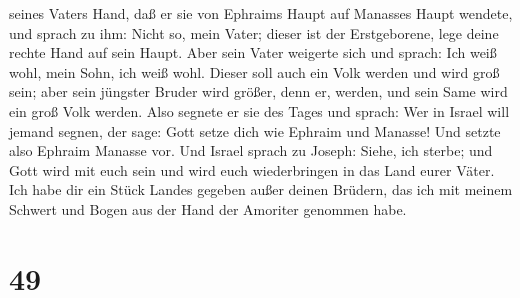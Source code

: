 seines Vaters Hand, daß er sie von Ephraims Haupt auf Manasses Haupt
wendete,  und sprach zu ihm: Nicht so, mein Vater; dieser
ist der Erstgeborene, lege deine rechte Hand auf sein Haupt.
 Aber sein Vater weigerte sich und sprach: Ich weiß wohl,
mein Sohn, ich weiß wohl. Dieser soll auch ein Volk werden und wird groß
sein; aber sein jüngster Bruder wird größer, denn er, werden, und sein
Same wird ein groß Volk werden.  Also segnete er sie des
Tages und sprach: Wer in Israel will jemand segnen, der sage: Gott setze
dich wie Ephraim und Manasse! Und setzte also Ephraim Manasse vor.
 Und Israel sprach zu Joseph: Siehe, ich sterbe; und Gott
wird mit euch sein und wird euch wiederbringen in das Land eurer Väter.
 Ich habe dir ein Stück Landes gegeben außer deinen
Brüdern, das ich mit meinem Schwert und Bogen aus der Hand der Amoriter
genommen habe.

\hypertarget{section-48}{%
\section{49}\label{section-48}}

